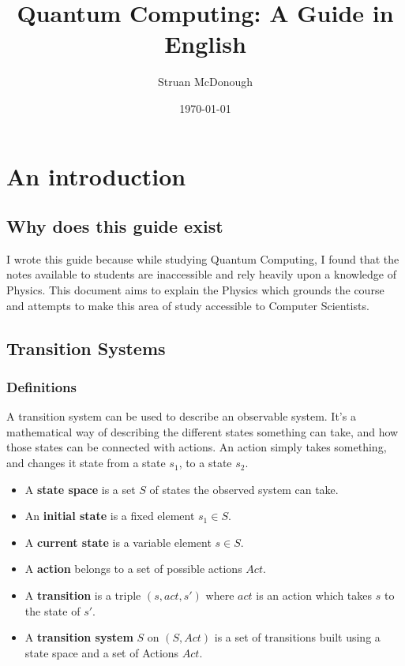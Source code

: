 \documentclass[12pt]{article}
\begin{document}
	\title{Quantum Computing: A Guide in English}     
	\author{Struan McDonough}
	\date{\today}
	\maketitle
	
\section{An introduction}

\subsection{Why does this guide exist}

I wrote this guide because while studying Quantum Computing, I found that the notes available to students are inaccessible and rely heavily upon a knowledge of Physics. This document aims to explain the Physics which grounds the course and attempts to make this area of study accessible to Computer Scientists.

\subsection{Transition Systems}

\subsubsection{Definitions}

A transition system can be used to describe an observable system. It's a mathematical way of describing the different states something can take, and how those states can be connected with actions. An action simply takes something, and changes it state from a state $s_1$, to a state $s_2$.

\begin{itemize}
\item A \textbf{state space} is a set $S$ of states the observed system can take.
\item An \textbf{initial state} is a fixed element $s_1 \in S$.
\item A \textbf{current state} is a variable element $s \in S$.
\item A \textbf{action} belongs to a set of possible actions $Act$.
\item A \textbf{transition} is a triple $(s, act, s')$ where $act$ is an action which takes $s$ to the state of $s'$.
\item A \textbf{transition system} $S$ on $(S, Act)$ is a set of transitions built using a state space and a set of Actions $Act$.
\end{itemize}
\end{document}
